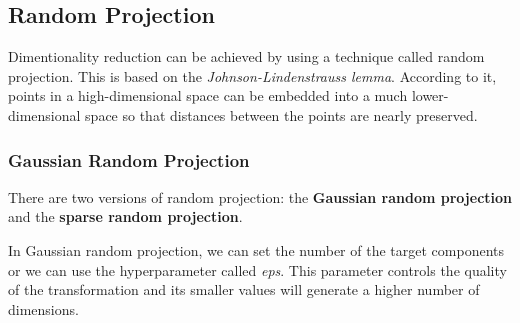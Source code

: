 \documentclass[11pt]{article}
\begin{document}
    \subsection{Random Projection}\label{random-projection}

Dimentionality reduction can be achieved by using a technique called
random projection. This is based on the \emph{Johnson-Lindenstrauss
lemma}. According to it, points in a high-dimensional space can be
embedded into a much lower-dimensional space so that distances between
the points are nearly preserved.

\subsubsection{Gaussian Random
Projection}\label{gaussian-random-projection}

There are two versions of random projection: the \textbf{Gaussian random
projection} and the \textbf{sparse random projection}.

In Gaussian random projection, we can set the number of the target
components or we can use the hyperparameter called \emph{eps}. This
parameter controls the quality of the transformation and its smaller
values will generate a higher number of dimensions.
\end{document}
